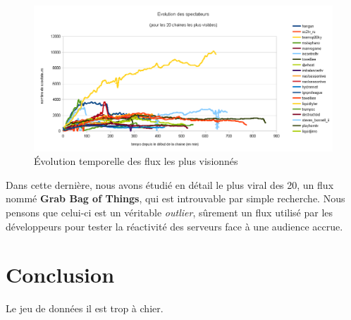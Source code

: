 \documentclass[11pt, a4paper, titlepage]{scrartcl}
\begin{document}
\begin{figure}[h]
    \centering
    \includegraphics[width=\textwidth]{images/top_20_view_evolutions}
    \caption{\label{fig:top_20_view_evolutions} Évolution temporelle des flux
        les plus visionnés}
\end{figure}

Dans cette dernière, nous avons étudié en détail le plus viral des 20, un flux
nommé \textbf{Grab Bag of Things}, qui est introuvable par simple recherche.
Nous pensons que celui-ci est un véritable \textit{outlier}, sûrement un flux
utilisé par les développeurs pour tester la réactivité des serveurs face à une
audience accrue.

\section{Conclusion}

Le jeu de données il est trop à chier.
\end{document}
